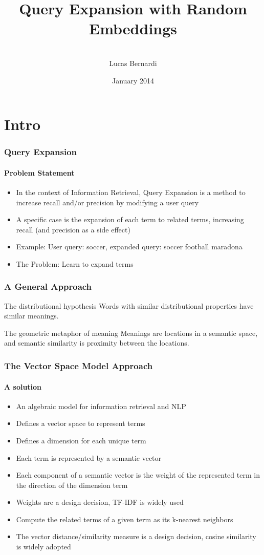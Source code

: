 \documentclass{beamer}
\title[RI]{Query Expansion with Random Embeddings}
\author[]{\\[4mm]Lucas Bernardi}
\date{January 2014}
\begin{document}
\frame{\titlepage}

\frame{\tableofcontents}

\section{Intro}

\begin{frame}
	\frametitle{Query Expansion}
	\framesubtitle{Problem Statement}
	\bigskip
	\begin{itemize}
	\item In the context of Information Retrieval, Query Expansion is a method to increase recall and/or precision by modifying a user query
  \item A specific case is the expansion of each term to related terms, increasing recall (and precision as a side effect)
  \item Example: User query: soccer, expanded query: soccer football maradona
  \item  The Problem: Learn to expand terms
	\end{itemize}
\end{frame}

\begin{frame}
	\frametitle{A General Approach}
	\begin{block}{The distributional hypothesis}
    Words with similar distributional properties have similar meanings.
  \end{block}
\bigskip
	\begin{block}{The geometric metaphor of meaning}
  Meanings are locations in a semantic space, and semantic similarity is proximity between the locations.
  \end{block}
\end{frame}


\begin{frame}
	\frametitle{The Vector Space Model Approach}
	\framesubtitle{A solution}
  \begin{itemize}
    \item	An algebraic model for information retrieval and NLP
    \item	Defines a vector space to represent terms
    \item	Defines a dimension for each unique term
    \item	Each term is represented by a semantic vector
    \item Each component of a semantic vector is the weight of the represented term in the direction of the dimension term
    \item Weights are a design decision, TF-IDF is widely used
    \item Compute the related terms of a given term as its k-nearest neighbors
    \item The vector distance/similarity measure is a design decision, cosine similarity is widely adopted
  \end{itemize}
\end{frame}
\end{document}
